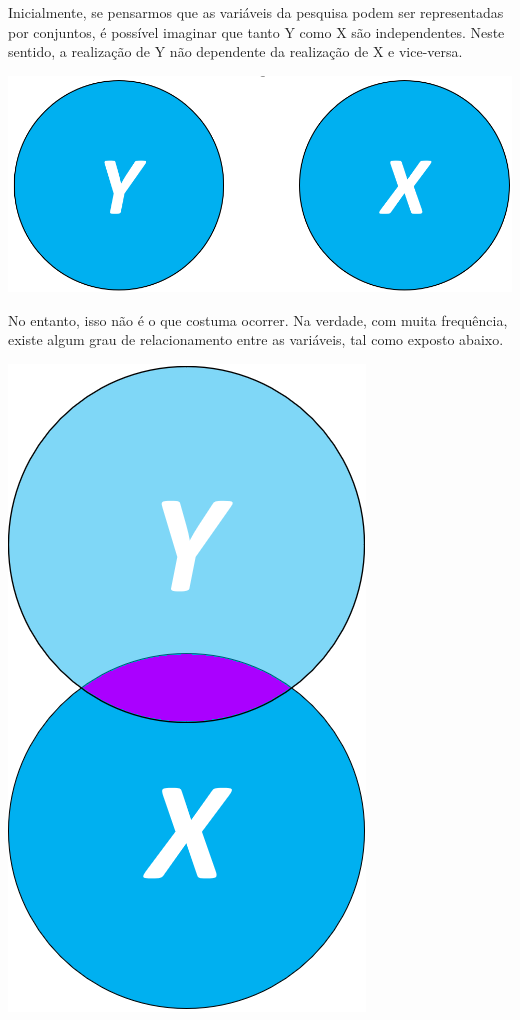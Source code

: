\documentclass[
]{book}
\begin{document}
Inicialmente, se pensarmos que as variáveis da pesquisa podem ser representadas por conjuntos, é possível imaginar que tanto Y como X são independentes. Neste sentido, a realização de Y não dependente da realização de X e vice-versa.

\includegraphics{./img/cap_reg_xy.png}

No entanto, isso não é o que costuma ocorrer. Na verdade, com muita frequência, existe algum grau de relacionamento entre as variáveis, tal como exposto abaixo.

\includegraphics{./img/cap_reg_x_y2.png}
\end{document}
